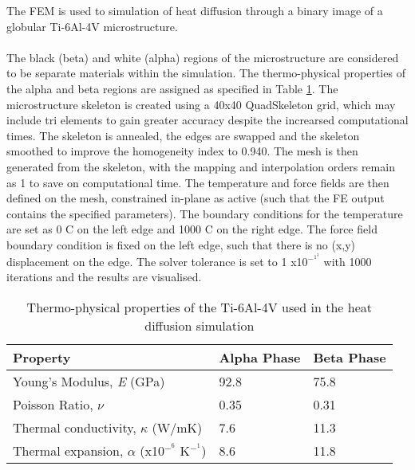 \documentclass[report.tex]{subfiles}
\begin{document}
The FEM is used to simulation of heat diffusion through a binary image of a globular Ti-6Al-4V microstructure.\\ %
\\
The black (beta) and white (alpha) regions of the microstructure are considered to be separate materials within the simulation. The thermo-physical properties of the alpha and beta regions are assigned as specified in Table \ref{tab:Ti64Properties}. The microstructure skeleton is created using a 40x40 QuadSkeleton grid, which may include tri elements to gain greater accuracy despite the increarsed computational times. The skeleton is annealed, the edges are swapped and the skeleton smoothed to improve the homogeneity index to 0.940. The mesh is then generated from the skeleton, with the mapping and interpolation orders remain as 1 to save on computational time. The temperature and force fields are then defined on the mesh, constrained in-plane as active (such that the FE output contains the specified parameters). The boundary conditions for the temperature are set as 0 \degree C on the left edge and 1000 \degree C on the right edge. The force field boundary condition is fixed on the left edge, such that there is no (x,y) displacement on the edge. The solver tolerance is set to 1 x10$^-^1^3$ with 1000 iterations and the results are visualised.

\begin{center}
  \begin{table}[h!]
  \caption{\label{tab:Ti64Properties}Thermo-physical properties of the Ti-6Al-4V used in the heat diffusion simulation}
  \begin{center}
  \begin{tabular}{|p{6cm}|p{3cm}|p{3cm}|}
  \hline
  \textbf{Property} &\textbf{Alpha Phase} &\textbf{Beta Phase}\\
  \hline
  Young's Modulus, \textit{E} (GPa) & 92.8 & 75.8 \\
   \hline
   Poisson Ratio, $\nu$ & 0.35 & 0.31 \\
   \hline
   Thermal conductivity, $\kappa$ (W/mK) & 7.6 & 11.3 \\
   \hline
   Thermal expansion, $\alpha$ (x10$^-^6$ K$^-^1$) & 8.6 & 11.8 \\
   \hline  
  \end{tabular}
  \end{center}
  \end{table}
\end{center}
\end{document}
